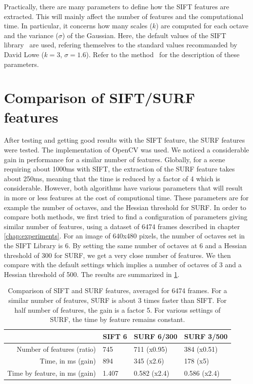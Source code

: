 Practically, there are many parameters to define how the \gls{SIFT} features are extracted. This will mainly affect the number of features and the computational time. In particular, it concerns how many scales ($k$) are computed for each octave and the variance ($\sigma$) of the Gaussian. Here, the default values of the \gls{SIFT} library~\cite{hess_sift} are used, refering themselves to the standard values recommanded by David Lowe ($k=3$, $\sigma=1.6$). Refer to the method~\cite{lowe_2004_sift} for the description of these parameters.

\section{Comparison of SIFT/SURF features}
After testing and getting good results with the \gls{SIFT} feature, the \gls{SURF} features~\cite{surf} were tested. The implementation of OpenCV was used. We noticed a considerable gain in performance for a similar number of features. Globally, for a scene requiring about 1000ms with \gls{SIFT}, the extraction of the \gls{SURF} feature takes about 250ms, meaning that the time is reduced by a factor of 4 which is considerable.
However, both algorithms have various parameters that will result in more or less features at the cost of computional time. These parameters are for example the number of octaves, and the Hessian threshold for SURF. In order to compare both methods, we first tried to find a configuration of parameters giving similar number of features, using a dataset of 6474 frames described in chapter \ref{chap:experiments}. For an image of 640x480 pixels, the number of octaves set in the SIFT Library is 6. By setting the same number of octaves at 6 and a Hessian threshold of 300 for \gls{SURF}, we get a very close number of features. We then compare with the default settings which implies a number of octaves of 3 and a Hessian threshold of 500. The results are summarized in \ref{tab:stats_features}.

\begin{table}[h!]
 \begin{tabular}{r|lll}
 & SIFT 6 & SURF 6/300 &  SURF 3/500 \\
 \hline
 Number of features (ratio) & 745 & 711 (x0.95) & 384 (x0.51) \\
 Time, in ms (gain) & 894 & 345 (x2.6) & 178 (x5) \\
 Time by feature, in ms (gain) & 1.407 & 0.582 (x2.4) & 0.586 (x2.4) \\
 \end{tabular}
\caption{Comparison of SIFT and SURF features, averaged for 6474 frames. For a similar number of features, SURF is about 3 times faster than SIFT. For half number of features, the gain is a factor 5. For various settings of SURF, the time by feature remains constant.}
\label{tab:stats_features}
\end{table}

